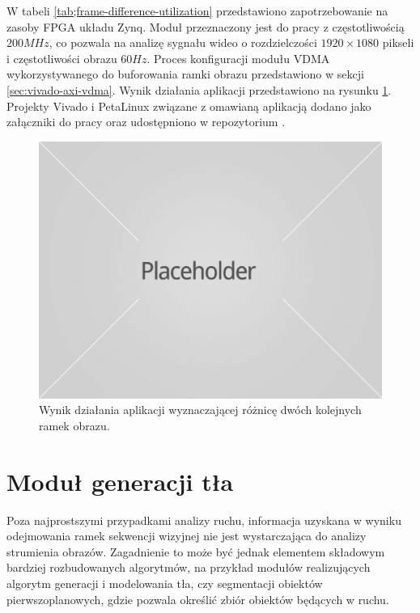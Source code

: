 W tabeli \ref{tab;frame-difference-utilization} przedstawiono zapotrzebowanie na zasoby FPGA układu Zynq.
Moduł przeznaczony jest do pracy z częstotliwością $200MHz$, co pozwala na analizę sygnału wideo o rozdzielczości $1920 \times 1080$ pikseli i częstotliwości obrazu $60Hz$.
Proces konfiguracji modułu VDMA wykorzystywanego do buforowania ramki obrazu przedstawiono w sekcji \ref{sec:vivado-axi-vdma}.
Wynik działania aplikacji przedstawiono na rysunku \ref{fig:frame-difference-result}. Projekty Vivado i PetaLinux związane z omawianą aplikacją dodano jako załączniki do pracy oraz udostępniono w repozytorium \cite{git-repository}.
\begin{figure}[!htb]
	\centering
	\includegraphics[width=12cm]{img/placeholder.jpg}
	\caption{Wynik działania aplikacji wyznaczającej różnicę dwóch kolejnych ramek obrazu.}
	\label{fig:frame-difference-result}
\end{figure}
\section{Moduł generacji tła}

Poza najprostszymi przypadkami analizy ruchu, informacja uzyskana w wyniku odejmowania ramek sekwencji wizyjnej nie jest wystarczająca do analizy strumienia obrazów.
Zagadnienie to może być jednak elementem składowym bardziej rozbudowanych algorytmów, na przykład modułów realizujących algorytm generacji i modelowania tła, czy segmentacji obiektów pierwszoplanowych, gdzie pozwala określić zbiór obiektów będących w ruchu. %

